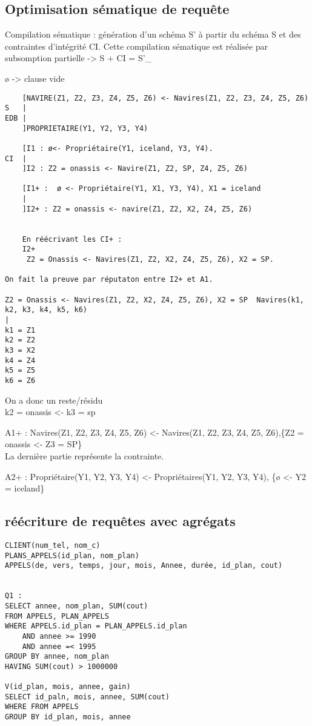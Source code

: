 {\subsection{Optimisation sématique de requête}
Compilation sématique : génération d'un schéma S' à partir du schéma S et des contraintes d'intégrité CI. Cette compilation sématique est réalisée par subsomption partielle -> S + CI = S'\_

ø -> clause vide
\begin{verbatim}
	[NAVIRE(Z1, Z2, Z3, Z4, Z5, Z6)	<- Navires(Z1, Z2, Z3, Z4, Z5, Z6)
S	|
EDB	|
	]PROPRIETAIRE(Y1, Y2, Y3, Y4)

	[I1 : ø<- Propriétaire(Y1, iceland, Y3, Y4).
CI	|
	]I2 : Z2 = onassis <- Navire(Z1, Z2, SP, Z4, Z5, Z6)
	
	[I1+ :  ø <- Propriétaire(Y1, X1, Y3, Y4), X1 = iceland
	|
	]I2+ : Z2 = onassis <- navire(Z1, Z2, X2, Z4, Z5, Z6)


	En réécrivant les CI+ :
	I2+
	 Z2 = Onassis <- Navires(Z1, Z2, X2, Z4, Z5, Z6), X2 = SP.

On fait la preuve par réputaton entre I2+ et A1.

Z2 = Onassis <- Navires(Z1, Z2, X2, Z4, Z5, Z6), X2 = SP  Navires(k1, k2, k3, k4, k5, k6)
|
k1 = Z1
k2 = Z2
k3 = X2
k4 = Z4
k5 = Z5
k6 = Z6

\end{verbatim}
On a donc un reste/résidu\\
k2 = onassis <- k3 = sp


A1+ : Navires(Z1, Z2, Z3, Z4, Z5, Z6) <- Navires(Z1, Z2, Z3, Z4, Z5, Z6),\{Z2 = onassis <- Z3 = SP\}\\
La dernière partie représente la contrainte.

A2+ : Propriétaire(Y1, Y2, Y3, Y4) <- Propriétaires(Y1, Y2, Y3, Y4), \{ø <- Y2 = iceland\}


\subsection{réécriture de requêtes avec agrégats}
\begin{verbatim}
CLIENT(num_tel, nom_c)
PLANS_APPELS(id_plan, nom_plan)
APPELS(de, vers, temps, jour, mois, Annee, durée, id_plan, cout)


Q1 : 
SELECT annee, nom_plan, SUM(cout)
FROM APPELS, PLAN_APPELS
WHERE APPELS.id_plan = PLAN_APPELS.id_plan 
	AND annee >= 1990
	AND annee =< 1995
GROUP BY annee, nom_plan
HAVING SUM(cout) > 1000000

V(id_plan, mois, annee, gain)
SELECT id_paln, mois, annee, SUM(cout)
WHERE FROM APPELS
GROUP BY id_plan, mois, annee



\end{verbatim}}
